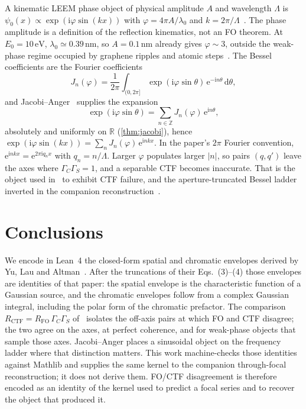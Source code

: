 \documentclass[11pt,a4paper]{article}
\theoremstyle{definition}
\theoremstyle{remark}
\newcommand{\R}{\mathbb{R}}
\newcommand{\Z}{\mathbb{Z}}
\newcommand{\dd}{\mathrm{d}}
\newcommand{\ee}{\mathrm{e}}
\newcommand{\ii}{\mathrm{i}}
\newcommand{\abs}[1]{\lvert#1\rvert}
\newcommand{\RFO}{R_{\mathrm{FO}}}
\newcommand{\RCTF}{R_{\mathrm{CTF}}}
\begin{document}
A kinematic LEEM phase object of physical amplitude $A$ and wavelength
$\Lambda$ is
$\psi_0(x)\propto\exp(\ii\varphi\sin(kx))$ with
$\varphi=4\pi A/\lambda_0$ and $k=2\pi/\Lambda$~\cite{Yu2017,Yu2019}.
The phase amplitude is a definition of the reflection kinematics, not
an FO theorem.
At $E_0=10\,\mathrm{eV}$, $\lambda_0\simeq 0.39\,\mathrm{nm}$, so
$A=0.1\,\mathrm{nm}$ already gives $\varphi\sim 3$, outside the
weak-phase regime occupied by graphene ripples and atomic
steps~\cite{Yu2017}.
The Bessel coefficients are the Fourier coefficients
\begin{equation}
\label{eq:Jn}
J_n(\varphi)
=\frac{1}{2\pi}
\int_{(0,2\pi]}
\exp(\ii\varphi\sin\theta)\,\ee^{-\ii n\theta}\,\dd\theta,
\end{equation}
and Jacobi--Anger~\cite{Yu2017,Yu2019} supplies the expansion
\begin{equation}
\label{eq:jacobi}
\exp(\ii\varphi\sin\theta)
=\sum_{n\in\Z}J_n(\varphi)\,\ee^{\ii n\theta},
\end{equation}
absolutely and uniformly on $\R$ (\cref{thm:jacobi}), hence
$\exp(\ii\varphi\sin(kx))=\sum_n J_n(\varphi)\,\ee^{\ii nkx}$.
In the paper's $2\pi$ Fourier convention,
$\ee^{\ii n k x}=\ee^{2\pi\ii q_n x}$ with $q_n=n/\Lambda$.
Larger $\varphi$ populates larger $\abs{n}$, so pairs $(q,q')$ leave
the axes where $\Gamma_C\Gamma_S=1$, and a separable CTF becomes
inaccurate.
That is the object used in~\cite{Yu2017,Yu2019} to exhibit CTF
failure, and the aperture-truncated Bessel ladder inverted in the
companion reconstruction~\cite{Lau2026inverse}.

\section{Conclusions}
\label{sec:end}

We encode in Lean~4 the closed-form spatial and chromatic envelopes
derived by Yu, Lau and Altman~\cite{Yu2019}.
After the truncations of their Eqs.~(3)--(4) those envelopes are
identities of that paper: the spatial envelope is the characteristic
function of a Gaussian source, and the chromatic envelopes follow from
a complex Gaussian integral, including the polar form of the chromatic
prefactor.
The comparison $\RCTF=\RFO\,\Gamma_C\Gamma_S$ of~\cite{Yu2019}
isolates the off-axis pairs at which FO and CTF disagree; the two
agree on the axes, at perfect coherence, and for weak-phase objects
that sample those axes.
Jacobi--Anger places a sinusoidal object on the frequency ladder where
that distinction matters.
This work machine-checks those identities against Mathlib and supplies
the same kernel to the companion through-focal reconstruction; it does
not derive them.
FO/CTF disagreement is therefore encoded as an identity of the kernel
used to predict a focal series and to recover the object that produced
it.
\end{document}
